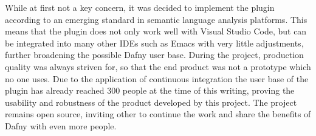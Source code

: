 While at first not a key concern, it was decided to implement the plugin according to an emerging standard in semantic language analysis platforms. This means that the plugin does not only work well with Visual Studio Code, but can be integrated into many other IDEs such as Emacs with very little adjustments, further broadening the possible Dafny user base. \newline
During the project, production quality was always striven for, so that the end product was not a prototype which no one uses. Due to the application of continuous integration the user base of the plugin has already reached 300 people at the time of this writing, proving the usability and robustness of the product developed by this project. The project remains open source, inviting other to continue the work and share the benefits of Dafny with even more people. \newline